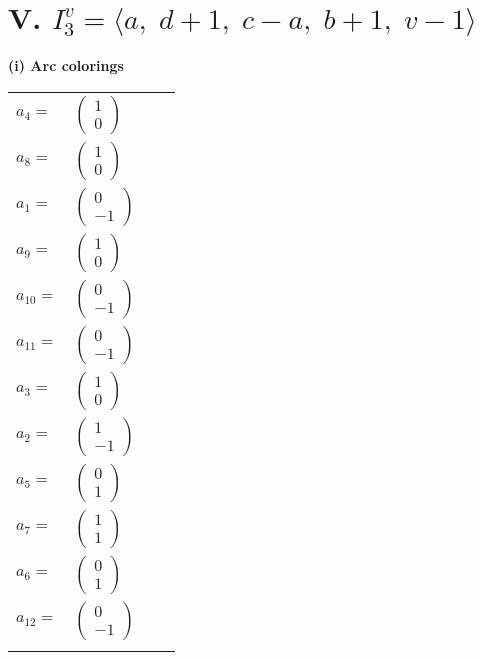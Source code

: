 \documentclass[1p]{elsarticle_modified}
\theoremstyle{definition}
\begin{document}
\centering \section*{V. $I^v_{3}= \langle a,\;d+1,\;c- a,\;b+1,\;v-1 \rangle$}
\flushleft \textbf{(i) Arc colorings}\\
\begin{tabular}{m{7pt} m{180pt} m{7pt} m{180pt} }
\flushright $a_{4}=$&$\begin{pmatrix}1\\0\end{pmatrix}$ \\
\flushright $a_{8}=$&$\begin{pmatrix}1\\0\end{pmatrix}$ \\
\flushright $a_{1}=$&$\begin{pmatrix}0\\-1\end{pmatrix}$ \\
\flushright $a_{9}=$&$\begin{pmatrix}1\\0\end{pmatrix}$ \\
\flushright $a_{10}=$&$\begin{pmatrix}0\\-1\end{pmatrix}$ \\
\flushright $a_{11}=$&$\begin{pmatrix}0\\-1\end{pmatrix}$ \\
\flushright $a_{3}=$&$\begin{pmatrix}1\\0\end{pmatrix}$ \\
\flushright $a_{2}=$&$\begin{pmatrix}1\\-1\end{pmatrix}$ \\
\flushright $a_{5}=$&$\begin{pmatrix}0\\1\end{pmatrix}$ \\
\flushright $a_{7}=$&$\begin{pmatrix}1\\1\end{pmatrix}$ \\
\flushright $a_{6}=$&$\begin{pmatrix}0\\1\end{pmatrix}$ \\
\flushright $a_{12}=$&$\begin{pmatrix}0\\-1\end{pmatrix}$\\&\end{tabular}
\end{document}
